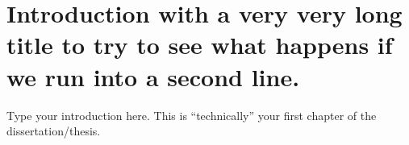 \chapter{Introduction with a very very long title to try to see what happens if we run into a second line. \getfontsizeofheading}

Type your introduction here.  This is ``technically'' your first chapter of the dissertation/thesis.